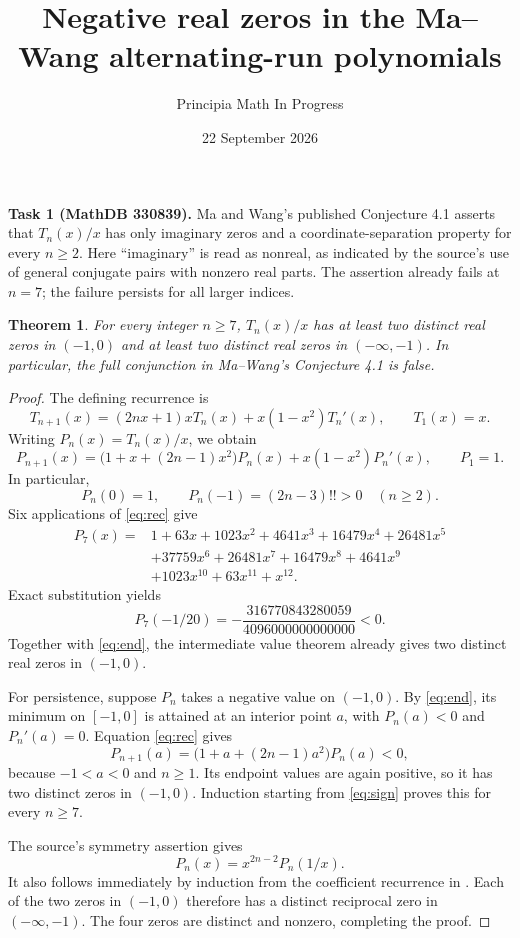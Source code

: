 \documentclass[11pt]{article}
\title{Negative real zeros in the Ma--Wang alternating-run polynomials}
\author{Principia Math In Progress}
\date{22 September 2026}
\newtheorem{theorem}{Theorem}
\begin{document}
\maketitle
\noindent\textbf{Task 1 (MathDB 330839).}
Ma and Wang's published Conjecture 4.1 \cite{MW} asserts that
$T_n(x)/x$ has only imaginary zeros and a coordinate-separation property
for every $n\ge2$. Here ``imaginary'' is read as nonreal, as indicated by
the source's use of general conjugate pairs with nonzero real parts.
The assertion already fails at $n=7$; the failure persists for all larger
indices.

\begin{theorem}
For every integer $n\ge7$, $T_n(x)/x$ has at least two distinct real zeros
in $(-1,0)$ and at least two distinct real zeros in $(-\infty,-1)$.
In particular, the full conjunction in Ma--Wang's Conjecture 4.1 is false.
\end{theorem}
\begin{proof}
The defining recurrence \cite[Eq.~(1.1)]{MW} is
\[
 T_{n+1}(x)=(2nx+1)xT_n(x)+x(1-x^2)T_n'(x),\qquad T_1(x)=x.
\]
Writing $P_n(x)=T_n(x)/x$, we obtain
\begin{equation}\label{eq:rec}
 P_{n+1}(x)=\bigl(1+x+(2n-1)x^2\bigr)P_n(x)
               +x(1-x^2)P_n'(x),\qquad P_1=1.
\end{equation}
In particular,
\begin{equation}\label{eq:end}
 P_n(0)=1,\qquad P_n(-1)=(2n-3)!!>0\quad(n\ge2).
\end{equation}
Six applications of \eqref{eq:rec} give
\begin{align*}
P_7(x)={}&1+63x+1023x^2+4641x^3+16479x^4+26481x^5\\
 &+37759x^6+26481x^7+16479x^8+4641x^9\\
 &+1023x^{10}+63x^{11}+x^{12}.
\end{align*}
Exact substitution yields
\begin{equation}\label{eq:sign}
 P_7(-1/20)=-\frac{316770843280059}{4096000000000000}<0.
\end{equation}
Together with \eqref{eq:end}, the intermediate value theorem already
gives two distinct real zeros in $(-1,0)$.

For persistence, suppose $P_n$ takes a negative value on $(-1,0)$.
By \eqref{eq:end}, its minimum on $[-1,0]$ is attained at an interior
point $a$, with $P_n(a)<0$ and $P_n'(a)=0$. Equation \eqref{eq:rec} gives
\[
 P_{n+1}(a)=\bigl(1+a+(2n-1)a^2\bigr)P_n(a)<0,
\]
because $-1<a<0$ and $n\ge1$. Its endpoint values are again positive,
so it has two distinct zeros in $(-1,0)$. Induction starting from
\eqref{eq:sign} proves this for every $n\ge7$.

The source's symmetry assertion \cite[Theorem 2.2]{MW} gives
\[
 P_n(x)=x^{2n-2}P_n(1/x).
\]
It also follows immediately by induction from the coefficient recurrence
in \cite[Eq.~(1.2)]{MW}. Each of the two zeros in $(-1,0)$ therefore has
a distinct reciprocal zero in $(-\infty,-1)$. The four zeros are distinct
and nonzero, completing the proof.
\end{proof}
\end{document}
